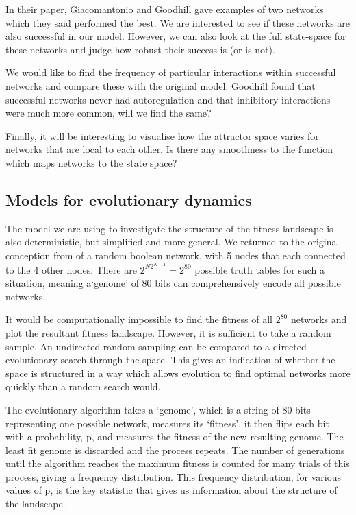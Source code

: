\documentclass[a4paper,11pt]{article}
\begin{document}
In their paper, Giacomantonio and Goodhill gave examples of two networks which they said performed the best. We are interested to see if these networks are also successful in our model. However, we can also look at the full state-space for these networks and judge how robust their success is (or is not).\par

We would like to find the frequency of particular interactions within successful networks and compare these with the original model. Goodhill found that successful networks never had autoregulation and that inhibitory interactions were much more common, will we find the same?\par

Finally, it will be interesting to visualise how the attractor space varies for networks that are local to each other. Is there any smoothness to the function which maps networks to the state space?\par

\subsection{Models for evolutionary dynamics}
The model we are using to investigate the structure of the fitness landscape is also deterministic, but simplified and more general. We returned to the original conception from \cite{Kauffman1969} of a random boolean network, with 5 nodes that each connected to the 4 other nodes. There are $2^{N2^{N-1}} = 2^{80}$ possible truth tables for such a situation, meaning a`genome' of 80 bits can comprehensively encode all possible networks.

It would be computationally impossible to find the fitness of all $2^{80}$ networks and plot the resultant fitness landscape. However, it is sufficient to take a random sample. An undirected random sampling can be compared to a directed evolutionary search through the space. This gives an indication of whether the space is structured in a way which allows evolution to find optimal networks more quickly than a random search would.\par

The evolutionary algorithm takes a ‘genome’, which is a string of 80 bits representing one possible network, measures its ‘fitness’, it then flips each bit with a probability, p, and measures the fitness of the new resulting genome. The least fit genome is discarded and the process repeats. The number of generations until the algorithm reaches the maximum fitness is counted for many trials of this process, giving a frequency distribution. This frequency distribution, for various values of p, is the key statistic that gives us information about the structure of the landscape.\par
\end{document}
